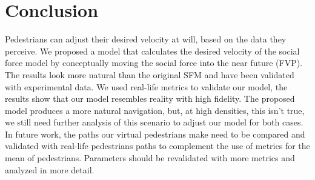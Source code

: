 \documentclass[draftclsnofoot]{IEEEtran}
\begin{document}
%
%


%




\section{Conclusion}

Pedestrians can adjust their desired velocity at will, based on the data they perceive.
We proposed a model that calculates the desired velocity of the social force model by
conceptually moving the social force into the near future (FVP). The results look
more natural than the original SFM and have been validated with experimental data.
We used real-life metrics to validate our model, the results show that our model
resembles reality with high fidelity.
The proposed model produces a more natural navigation, but, at high densities, this
isn't true, we still need further analysis of this scenario to adjust our model for
both cases. In future work, the paths our virtual pedestrians make need to be compared
and validated with real-life pedestrians paths to complement the use of metrics for the
mean of pedestrians. Parameters should be revalidated with more metrics and analyzed in
more detail.
\end{document}
